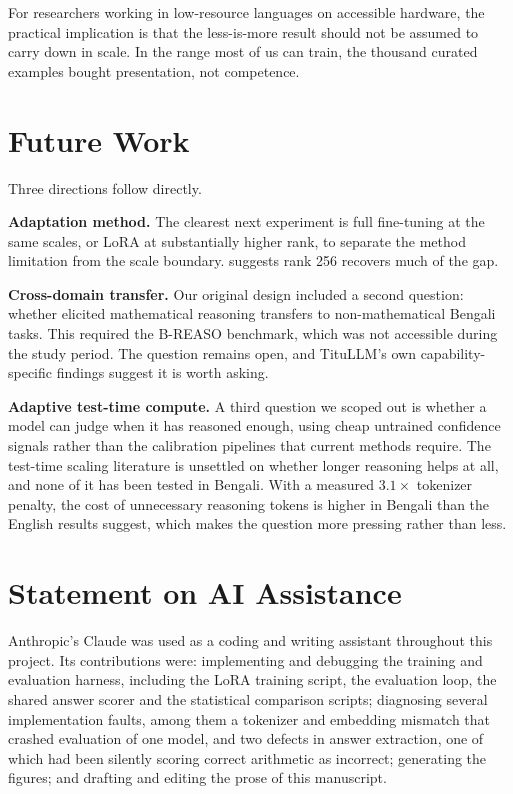 \documentclass[10pt,twocolumn,letterpaper]{article}
\begin{document}
For researchers working in low-resource languages on accessible hardware, the
practical implication is that the less-is-more result should not be assumed to
carry down in scale. In the range most of us can train, the thousand curated
examples bought presentation, not competence.


\section{Future Work}

Three directions follow directly.

\textbf{Adaptation method.} The clearest next experiment is full fine-tuning at
the same scales, or LoRA at substantially higher rank, to separate the method
limitation from the scale boundary. \textcite{biderman2024lora} suggests rank %
256 recovers much of the gap.

\textbf{Cross-domain transfer.} Our original design included a second question:
whether elicited mathematical reasoning transfers to non-mathematical Bengali
tasks. This required the B-REASO benchmark, which was not accessible during the
study period. The question remains open, and TituLLM's own capability-specific
findings \parencite{nahin2025titullm} suggest it is worth asking.

\textbf{Adaptive test-time compute.} A third question we scoped out is whether a
model can judge when it has reasoned enough, using cheap untrained confidence
signals rather than the calibration pipelines that current methods require. The
test-time scaling literature is unsettled on whether longer reasoning helps at
all, and none of it has been tested in Bengali. With a measured $3.1\times$
tokenizer penalty, the cost of unnecessary reasoning tokens is higher in Bengali
than the English results suggest, which makes the question more pressing rather
than less.

\section*{Statement on AI Assistance}

Anthropic's Claude was used as a coding and writing assistant throughout this
project. Its contributions were: implementing and debugging the training and
evaluation harness, including the LoRA training script, the evaluation loop,
the shared answer scorer and the statistical comparison scripts; diagnosing
several implementation faults, among them a tokenizer and embedding mismatch
that crashed evaluation of one model, and two defects in answer extraction, one
of which had been silently scoring correct arithmetic as incorrect; generating
the figures; and drafting and editing the prose of this manuscript.
\end{document}
